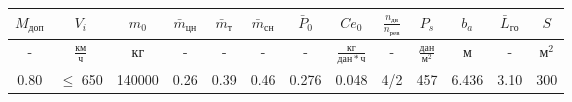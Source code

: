 \begin{tabular}{|c|c|c|c|c|c|c|c|c|c|c|c|c|}
\hline
$M_{доп}$ & $V_{i}$ & $m_0$ & $\bar{m}_{цн}$ & $\bar{m}_т$ & $\bar{m}_{сн}$ & $\bar{P}_0$ & $Ce_0$ & $\frac{n_{дв}}{n_{рев}}$ & $P_s$ & $b_a$ & $\bar{L}_{го}$ & $S$ \\ 
\hline
- & $\frac{км}{ч}$ & кг & - & - & - & - & $\frac{кг}{дан \ast ч}$ & - & $\frac{дан}{м^2}$ & м & - & $м^2$ \\ 
\hline
0.80 & $\le$ 650 & 140000 & 0.26 & 0.39 & 0.46 & 0.276 & 0.048 & 4/2 & 457 & 6.436 & 3.10 & 300 \\ 
\hline
\end{tabular}